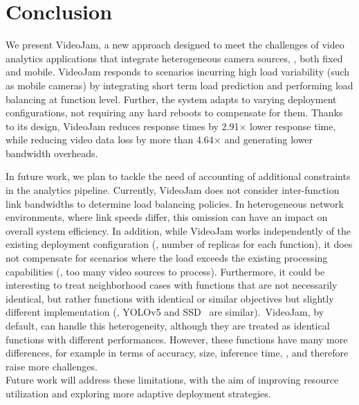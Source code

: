 \section{Conclusion}\label{sec:conclusion}

We present VideoJam, a new approach designed to meet the challenges of video analytics applications that integrate heterogeneous camera sources, \ie, both fixed and mobile. VideoJam responds to scenarios incurring high load variability (such as mobile cameras) by integrating short term load prediction and performing load balancing at function level. Further, the system adapts to varying deployment configurations, not requiring any hard reboots to compensate for them. Thanks to its design, VideoJam reduces response times by 2.91$\times$ lower response time, while reducing video data loss by more than 4.64$\times$  and generating lower bandwidth overheads.

In future work, we plan to tackle the need of accounting of additional constraints in the analytics pipeline. Currently, VideoJam does not consider inter-function link bandwidths to determine load balancing policies. In heterogeneous network environments, where link speeds differ, this omission can have an impact on overall system efficiency. In addition, while VideoJam works independently of the existing deployment configuration (\eg, number of replicas for each function), it does not compensate for scenarios where the load exceeds the existing processing capabilities (\eg, too many video sources to process). Furthermore, it could be interesting to treat neighborhood cases with functions that are not necessarily identical, but rather functions with identical or similar objectives but slightly different implementation (\eg, YOLOv5 and SSD~\cite{liu2016ssd} are similar).~VideoJam, by default, can handle this heterogeneity, although they are treated as identical functions with different performances. However, these functions have many more differences, for example in terms of accuracy, size, inference time, \etc, and therefore raise more challenges.\\
Future work will address these limitations, with the aim of improving resource utilization and exploring more adaptive deployment strategies.